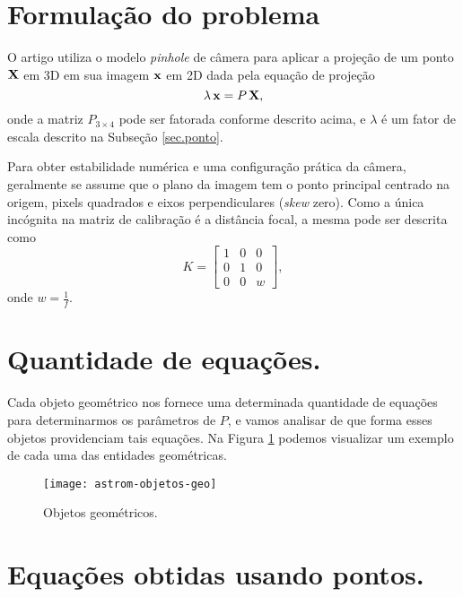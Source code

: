 \section{Formulação do problema}

O artigo utiliza o modelo {\it pinhole} de câmera para aplicar a projeção de um ponto $\mathbf{X}$ em 3D em sua imagem $\mathbf{x}$ em 2D dada pela equação de projeção
\begin{equation}\label{eq.projecao}
\lambda\,\mathbf{x}=P\,\mathbf{X},
\end{equation}
onde a matriz $P_{3\times4}$ pode ser fatorada conforme descrito acima, e $\lambda$ é um fator de escala descrito na Subseção \ref{sec.ponto}. 

Para obter estabilidade numérica e uma configuração prática da câmera, geralmente se assume que o plano da imagem tem o ponto principal centrado na origem, pixels quadrados e eixos perpendiculares ({\it skew} zero). Como a única incógnita na matriz de calibração é a distância focal, a mesma pode ser descrita como
\begin{equation}\label{eq.astrom-K}
K=
\begin{bmatrix}
1&0&0\\
0&1&0\\
0&0&w
\end{bmatrix},
\end{equation}
onde $w=\frac{1}{f}$.
\section*{Quantidade de equações.}

Cada objeto geométrico nos fornece uma determinada quantidade de equações para determinarmos os parâmetros de $P$, e vamos analisar de que forma esses objetos providenciam tais equações. Na Figura \ref{fig.astrom-objetos-geo} podemos visualizar um exemplo de cada uma das entidades geométricas.
\begin{figure}[!htb]{\textwidth}
\caption{Objetos geom\'etricos.}
\texttt{[image: astrom-objetos-geo]}
\label{fig.astrom-objetos-geo}
\end{figure}
\section*{Equações obtidas usando pontos.}

